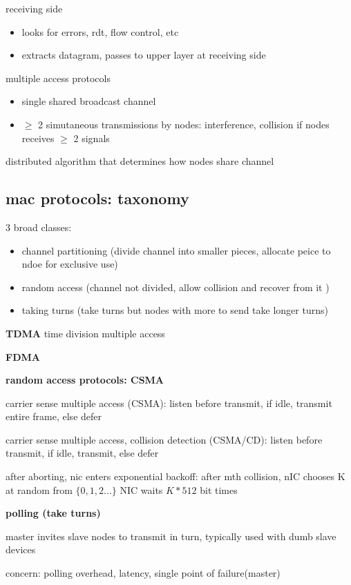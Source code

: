 \documentclass[10pt]{article}
\theoremstyle{break}
\begin{document}
receiving side 
\begin{itemize}
    \item looks for errors, rdt, flow control, etc 
    \item extracts datagram, passes to upper layer at receiving side
\end{itemize}


multiple access protocols 
\begin{itemize}
    \item single shared broadcast channel 
    \item $\geq$ 2 simutaneous transmissions by nodes: interference, collision if nodes receives $\geq$ 2 signals 
\end{itemize}

distributed algorithm that determines how nodes share channel 

\subsection{mac protocols: taxonomy}
3 broad classes:
\begin{itemize}
    \item channel partitioning  (divide channel into smaller pieces, allocate peice to ndoe for exclusive use)
    \item random access (channel not divided, allow collision and recover from it )
    \item taking turns (take turns but nodes with more to send take longer turns)
\end{itemize}

\textbf{TDMA} time division multiple access 

\textbf{FDMA}

\textbf{random access protocols: CSMA}

carrier sense multiple access (CSMA): listen before transmit, if idle, transmit entire frame, else defer

carrier sense multiple access, collision detection (CSMA/CD): listen before transmit, if idle, transmit, else defer

after aborting, nic enters exponential backoff: after mth collision, nIC chooses K at random from $\{0,1,2...\}$ NIC waits $K*512$ bit times

\textbf{polling (take turns)}

master invites slave nodes to transmit in turn, typically used with dumb slave devices 

concern: polling overhead, latency, single point of failure(master)
\end{document}

